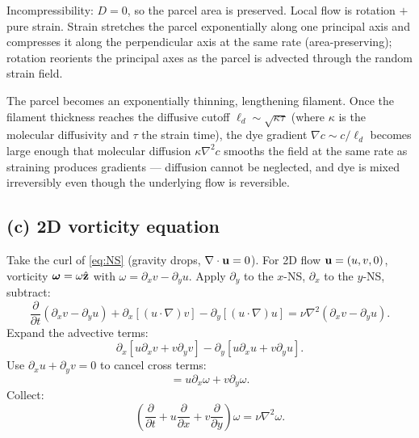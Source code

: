 \documentclass[11pt]{article}
\newcommand{\pd}[2]{\frac{\partial #1}{\partial #2}}
\newcommand{\Lap}{\nabla^{2}}
\begin{document}
Incompressibility: $D=0$, so the parcel area is preserved. Local flow is rotation $+ $ pure strain. Strain stretches the parcel exponentially along one principal axis and compresses it along the perpendicular axis at the same rate (area-preserving); rotation reorients the principal axes as the parcel is advected through the random strain field.

\begin{center}
\end{center}

The parcel becomes an exponentially thinning, lengthening filament. Once the filament thickness reaches the diffusive cutoff $\ell_d \sim \sqrt{\kappa\tau}$ (where $\kappa$ is the molecular diffusivity and $\tau$ the strain time), the dye gradient $\nabla c \sim c/\ell_d$ becomes large enough that molecular diffusion $\kappa\Lap c$ smooths the field at the same rate as straining produces gradients --- diffusion cannot be neglected, and dye is mixed irreversibly even though the underlying flow is reversible.

\subsection*{(c) 2D vorticity equation}

Take the curl of \eqref{eq:NS} (gravity drops, $\nabla\cdot\vb u=0$). For 2D flow $\vb u=(u,v,0)$, vorticity $\bm\omega=\omega\hat{\vb z}$ with $\omega = \partial_x v - \partial_y u$. Apply $\partial_y$ to the $x$-NS, $\partial_x$ to the $y$-NS, subtract:
\[ \pd{}{t}(\partial_x v - \partial_y u) + \partial_x[(u\cdot\nabla)v] - \partial_y[(u\cdot\nabla)u] = \nu\Lap(\partial_x v - \partial_y u). \]
Expand the advective terms:
\[ \partial_x[u\partial_x v + v\partial_y v] - \partial_y[u\partial_x u + v\partial_y u]. \]
Use $\partial_x u + \partial_y v = 0$ to cancel cross terms:
\[ = u\partial_x\omega + v\partial_y\omega. \]
Collect:
\begin{equation}
\boxed{\;\left(\pd{}{t} + u\pd{}{x} + v\pd{}{y}\right)\omega = \nu\Lap\omega.\;}
\label{eq:vort2D}
\end{equation}
\end{document}
